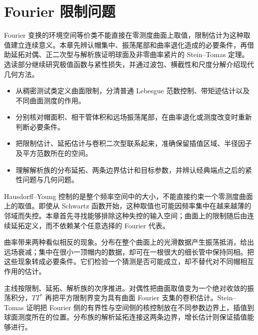 \chapter{Fourier 限制问题}
\label{b2:ch:23}
\begin{chapterabstract}
Fourier 变换的环境空间等价类不能直接在零测度曲面上取值，限制估计为这种取值建立连续意义。本章先辨认帽集中、振荡尾部和曲率退化造成的必要条件，再借助延拓对偶、正二次型与解析族证明球面及非零曲率紧片的 Stein--Tomas 定理。选读部分继续研究极值函数与紧性损失，并通过波包、横截性和尺度分解介绍现代几何方法。
\end{chapterabstract}

\begin{learninggoals}\begin{itemize}
\item\label{b2:item:23-goal-1}从稠密测试类定义曲面限制，分清普通 Lebesgue 范数控制、带矩迹估计以及不同曲面测度的作用。
\item\label{b2:item:23-goal-2}分别核对帽面积、相干管体积和远场振荡尾部，在曲率退化或测度改变时重新判断必要条件。
\item\label{b2:item:23-goal-3}把限制估计、延拓估计与卷积二次型联系起来，准确保留插值区域、半径因子及平方范数所在的空间。
\item\label{b2:item:23-goal-4}理解解析族的分布延拓、两条边界估计和目标参数，并辨认经典端点之后的紧性问题与几何问题。
\end{itemize}\end{learninggoals}

Hausdorff--Young 控制的是整个频率空间中的大小，不能直接约束一个零测度曲面上的取值。即使从 Schwartz 函数开始，这种取值也可能因频率集中在越来越薄的邻域而失控。本章首先寻找能够排除这种失控的输入空间；曲面上的限制随后由连续延拓定义，而不依赖某个任意选择的 Fourier 代表。

\ProseParagraphBreak

曲率带来两种看似相反的现象。分布在整个曲面上的光滑数据产生振荡抵消，给出远场衰减；集中在很小一顶帽内的数据，却可在一根很大的细长管中保持同相。把这些现象转成必要条件。它们检验一个猜测是否可能成立，却不替代对不同帽相互作用的估计。

\ProseParagraphBreak

主线按限制、延拓、解析族的次序推进。对偶性把曲面取值变为一个绝对收敛的振荡积分，\(TT^*\) 再把平方限制界变为具有曲面 Fourier 支集的卷积估计。Stein--Tomas 证明把 Fourier 侧的有界性与空间侧的核控制放在不同参数边界上，插值到球面测度所在的位置。分布族的解析延拓连接这两条边界，增长估计则保证插值能够进行。

